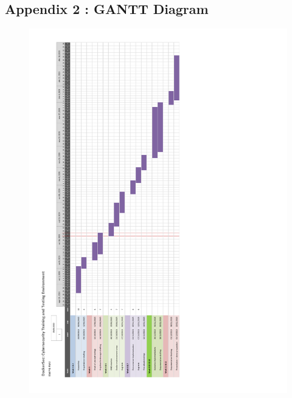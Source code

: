 \documentclass[a4paper,11pt,singlespacing]{article}
\begin{document}
\subsection{Appendix 2 : GANTT Diagram}
\label{Appendix2}
\begin{figure}[bp!]
    \centering
    \includegraphics[scale = 0.8]{images/gantt_diagram.pdf}
\end{figure}
\newpage




\newpage



\newpage
\end{document}
